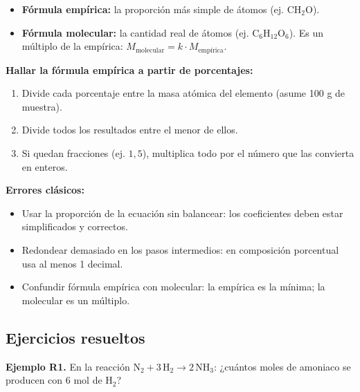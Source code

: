 \documentclass[12pt, letterpaper]{article}
\begin{document}
\begin{cuadroteoria}
  \begin{itemize}[leftmargin=*]
    \item \textbf{Fórmula empírica:} la proporción más simple de átomos (ej. $\text{CH}_2\text{O}$).
    \item \textbf{Fórmula molecular:} la cantidad real de átomos (ej. $\text{C}_6\text{H}_{12}\text{O}_6$). Es un múltiplo de la empírica: $M_{\text{molecular}} = k \cdot M_{\text{empírica}}$.
  \end{itemize}
\end{cuadroteoria}

\newpage

\begin{cuadropasos}
  \textbf{Hallar la fórmula empírica a partir de porcentajes:}
  \begin{enumerate}[leftmargin=*]
    \item Divide cada porcentaje entre la masa atómica del elemento (asume 100 g de muestra).
    \item Divide todos los resultados entre el menor de ellos.
    \item Si quedan fracciones (ej. $1{,}5$), multiplica todo por el número que las convierta en enteros.
  \end{enumerate}
\end{cuadropasos}

\begin{cuadroadvertencia}
  \textbf{Errores clásicos:}
  \begin{itemize}[leftmargin=*]
    \item Usar la proporción de la ecuación sin balancear: los coeficientes deben estar simplificados y correctos.
    \item Redondear demasiado en los pasos intermedios: en composición porcentual usa al menos 1 decimal.
    \item Confundir fórmula empírica con molecular: la empírica es la mínima; la molecular es un múltiplo.
  \end{itemize}
\end{cuadroadvertencia}

\subsection{Ejercicios resueltos}

\textbf{Ejemplo R1.} En la reacción $\text{N}_2 + 3\,\text{H}_2 \rightarrow 2\,\text{NH}_3$: ¿cuántos moles de amoniaco se producen con 6 mol de $\text{H}_2$?
\end{document}
